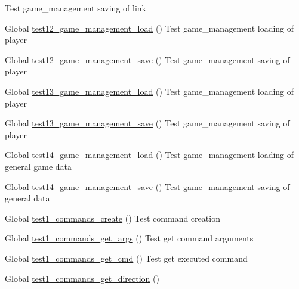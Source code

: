 \begin{DoxyRefList}
%
Test game\+\_\+management saving of link  
\item[Global \mbox{\hyperlink{game__management__test_8c_a500efd71e133a3b1609e583f73c27be5}{test12\+\_\+game\+\_\+management\+\_\+load}} ()]\label{test__test000120}%
%
Test game\+\_\+management loading of player  
\item[Global \mbox{\hyperlink{game__management__test_8c_a8af79ad06946a1c4372d6967fac0bda4}{test12\+\_\+game\+\_\+management\+\_\+save}} ()]\label{test__test000134}%
%
Test game\+\_\+management saving of player  
\item[Global \mbox{\hyperlink{game__management__test_8c_a3ccbf68ebf3343f3b15ece86b90fe874}{test13\+\_\+game\+\_\+management\+\_\+load}} ()]\label{test__test000121}%
%
Test game\+\_\+management loading of player  
\item[Global \mbox{\hyperlink{game__management__test_8c_a5833d6f2a0dbd731d9bacb27bb9e5e4a}{test13\+\_\+game\+\_\+management\+\_\+save}} ()]\label{test__test000135}%
%
Test game\+\_\+management saving of player  
\item[Global \mbox{\hyperlink{game__management__test_8c_a2c93c2ee04cfb02c1d249646c936561a}{test14\+\_\+game\+\_\+management\+\_\+load}} ()]\label{test__test000122}%
%
Test game\+\_\+management loading of general game data  
\item[Global \mbox{\hyperlink{game__management__test_8c_abc4c874e240baabae06230eb01287649}{test14\+\_\+game\+\_\+management\+\_\+save}} ()]\label{test__test000136}%
%
Test game\+\_\+management saving of general data  
\item[Global \mbox{\hyperlink{command__test_8c_ae9a1f52fd70365f49bbe206c1217183d}{test1\+\_\+commands\+\_\+create}} ()]\label{test__test000001}%
%
Test command creation  
\item[Global \mbox{\hyperlink{command__test_8c_a82435e0e7c77bf656166ca02ecaca069}{test1\+\_\+commands\+\_\+get\+\_\+args}} ()]\label{test__test000008}%
%
Test get command arguments  
\item[Global \mbox{\hyperlink{command__test_8c_acccb94869208d599a6a95caa5bc208cb}{test1\+\_\+commands\+\_\+get\+\_\+cmd}} ()]\label{test__test000005}%
%
Test get executed command  
\item[Global \mbox{\hyperlink{command__test_8c_a738d93861689abb08279bc235df3bffd}{test1\+\_\+commands\+\_\+get\+\_\+direction}} ()]\label{test__test000019}%

\end{DoxyRefList}

